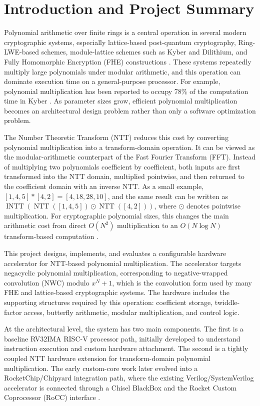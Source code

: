 \documentclass[a4paper, 12pt, titlepage]{article}
\begin{document}
\section{Introduction and Project Summary}

Polynomial arithmetic over finite rings is a central operation in several
modern cryptographic systems, especially lattice-based post-quantum
cryptography, Ring-LWE-based schemes, module-lattice schemes such as Kyber and
Dilithium, and Fully Homomorphic Encryption (FHE) constructions
\cite{kyber, rns-fhe}. These systems repeatedly multiply large polynomials
under modular arithmetic, and this operation can dominate execution time on a
general-purpose processor. For example, polynomial multiplication has been
reported to occupy 78\% of the computation time in Kyber \cite{kyber-78}. As
parameter sizes grow, efficient polynomial multiplication becomes an
architectural design problem rather than only a software optimization problem.

The Number Theoretic Transform (NTT) reduces this cost by converting
polynomial multiplication into a transform-domain operation. It can be viewed
as the modular-arithmetic counterpart of the Fast Fourier Transform (FFT).
Instead of multiplying two polynomials coefficient by coefficient, both inputs
are first transformed into the NTT domain, multiplied pointwise, and then
returned to the coefficient domain with an inverse NTT. As a small example,
\([1,4,5] * [4,2] = [4,18,28,10]\), and the same result can be written as
\(\operatorname{INTT}(\operatorname{NTT}([1,4,5]) \odot
\operatorname{NTT}([4,2]))\), where \(\odot\) denotes pointwise
multiplication. For cryptographic polynomial sizes, this changes the main
arithmetic cost from direct \(O(N^2)\) multiplication to an
\(O(N \log N)\) transform-based computation \cite{guide-ntt}.

This project designs, implements, and evaluates a configurable hardware
accelerator for NTT-based polynomial multiplication. The accelerator targets
negacyclic polynomial multiplication, corresponding to negative-wrapped
convolution (NWC) modulo \(x^N+1\), which is the convolution form used by many
FHE and lattice-based cryptographic systems. The hardware includes the
supporting structures required by this operation: coefficient storage,
twiddle-factor access, butterfly arithmetic, modular multiplication, and
control logic.

At the architectural level, the system has two main components. The first is a
baseline RV32IMA RISC-V processor path, initially developed to understand
instruction execution and custom hardware attachment. The second is a tightly
coupled NTT hardware extension for transform-domain polynomial multiplication.
The early custom-core work later evolved into a RocketChip/Chipyard integration
path, where the existing Verilog/SystemVerilog accelerator is connected through
a Chisel BlackBox and the Rocket Custom Coprocessor (RoCC) interface
\cite{chipyard}.
\end{document}
